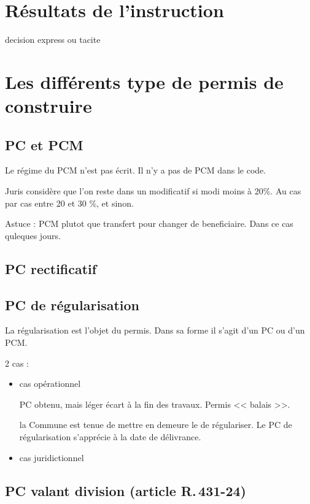 \section{Résultats de l'instruction} %

	decision express ou tacite

\section{Les différents type de permis de construire}

	\subsection{PC et PCM}

		Le régime du PCM n'est pas écrit. Il n'y a pas de PCM dans le code.

		Juris considère que l'on reste dans un modificatif si modi moins à 20\%. Au cas par cas entre 20 et 30 \%, et sinon.

		Astuce : PCM plutot que transfert pour changer de beneficiaire. Dans ce cas quleques jours.

	\subsection{PC rectificatif}

	\subsection{PC de régularisation}
	La régularisation est l'objet du permis. Dans sa forme il s'agit d'un PC ou d'un PCM.

	2 cas :
	\begin{itemize}
		\item cas opérationnel

		PC obtenu, mais léger écart à la fin des travaux. Permis << balais >>.

		la Commune est tenue de mettre en demeure le de régulariser. Le PC de régularisation s'apprécie à la date de délivrance.

		\item cas juridictionnel

	\end{itemize}

	\subsection{PC valant division (article R.\,431-24)}

